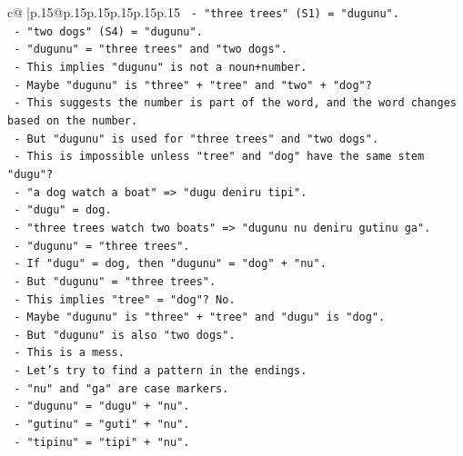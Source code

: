 \documentclass{article}
\begin{document}
{\begin{supertabular}{c@{$\;$}|p{.15\linewidth}@{}p{.15\linewidth}p{.15\linewidth}p{.15\linewidth}p{.15\linewidth}p{.15\linewidth}}
{{{\texttt{                  {-} "three trees" (S1) = "dugunu".} \\
\texttt{                  {-} "two dogs" (S4) = "dugunu".} \\
\texttt{                  {-} "dugunu" = "three trees" and "two dogs".} \\
\texttt{                  {-} This implies "dugunu" is not a noun+number.} \\
\texttt{                  {-} Maybe "dugunu" is "three" + "tree" and "two" + "dog"?} \\
\texttt{                  {-} This suggests the number is part of the word, and the word changes based on the number.} \\
\texttt{                  {-} But "dugunu" is used for "three trees" and "two dogs".} \\
\texttt{                  {-} This is impossible unless "tree" and "dog" have the same stem "dugu"?} \\
\texttt{                  {-} "a dog watch a boat" => "dugu deniru tipi".} \\
\texttt{                    {-} "dugu" = dog.} \\
\texttt{                  {-} "three trees watch two boats" => "dugunu nu deniru gutinu ga".} \\
\texttt{                    {-} "dugunu" = "three trees".} \\
\texttt{                    {-} If "dugu" = dog, then "dugunu" = "dog" + "nu".} \\
\texttt{                    {-} But "dugunu" = "three trees".} \\
\texttt{                    {-} This implies "tree" = "dog"? No.} \\
\texttt{                  {-} Maybe "dugunu" is "three" + "tree" and "dugu" is "dog".} \\
\texttt{                  {-} But "dugunu" is also "two dogs".} \\
\texttt{                  {-} This is a mess.} \\
\texttt{                  {-} Let's try to find a pattern in the endings.} \\
\texttt{                  {-} "nu" and "ga" are case markers.} \\
\texttt{                  {-} "dugunu" = "dugu" + "nu".} \\
\texttt{                  {-} "gutinu" = "guti" + "nu".} \\
\texttt{                  {-} "tipinu" = "tipi" + "nu".} \\
}}}
\end{supertabular}}
\end{document}
